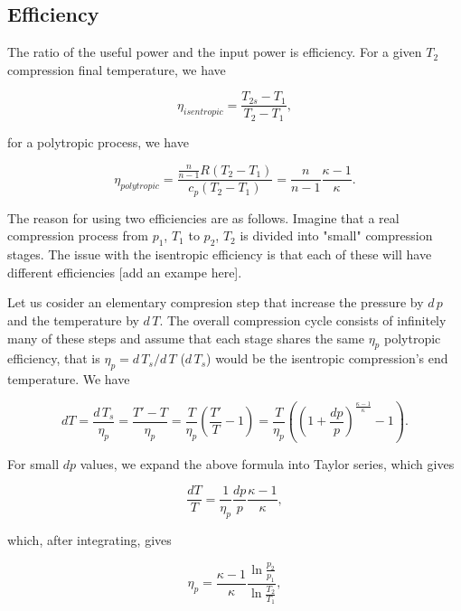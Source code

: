 \subsection{Efficiency}

The ratio of the useful power and the input power is efficiency. For a given $T_2$ compression final temperature, we have

\begin{equation}
\eta_{isentropic}=\frac{T_{2s}-T_1}{T_2-T_1},
\end{equation}

\noindent for a polytropic process, we have

\begin{equation}
\eta_{polytropic}=\frac{\frac{n}{n-1}R (T_2-T_1)}{c_p(T_2-T_1)}=\frac{n}{n-1}\frac{\kappa-1}{\kappa}.
\end{equation}

The reason for using two efficiencies are as follows. Imagine that  a real compression process from $p_1$, $T_1$ to $p_2$, $T_2$ is divided into "small" compression stages. The issue with the isentropic efficiency is that each of these will have different efficiencies [add an exampe here].

Let us cosider an elementary compresion step that increase the pressure by $d\,p$ and the temperature by $d\,T$. The overall compression cycle consists of infinitely many of these steps and assume that each stage shares the same $\eta_p$ polytropic efficiency, that is $\eta_p=d\,T_s/d\,T$ ($d\,T_s$) would be the isentropic compression's end temperature. We have

\begin{equation}
  dT=\frac{d\,T_s}{\eta_p}=\frac{T'-T}{\eta_p}
  =\frac{T}{\eta_p}\left(\frac{T'}{T}-1\right)
  =\frac{T}{\eta_p}\left(\left(1+\frac{dp}{p}\right)^{\frac{\kappa-1}{\kappa}}-1\right). 
\end{equation}

For small $dp$ values, we expand the above formula into Taylor series, which gives

\begin{equation}
  \frac{dT}{T} = \frac{1}{\eta_p} \frac{dp}{p} \frac{\kappa-1}{\kappa}, 
\end{equation}

which, after integrating, gives

\begin{equation}
  \eta_p=\frac{\kappa-1}{\kappa}\frac{\ln \frac{p_2}{p_1}}{\ln \frac{T_2}{T_1}},
\end{equation}

